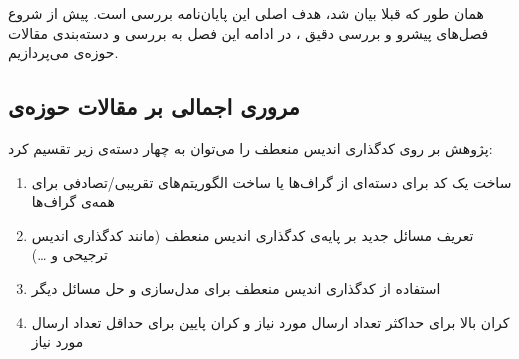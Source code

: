  همان طور که قبلا بیان شد، هدف اصلی این پایان‌نامه بررسی
 \picod
 است. پیش از شروع فصل‌های پیشرو و بررسی دقیق 
 \picods، در ادامه این فصل به بررسی و دسته‌بندی مقالات حوزه‌ی
  \picod
  می‌پردازیم.
 \subsection{مروری اجمالی بر مقالات حوزه‌ی
 	\picod}
  پژوهش بر روی کدگذاری اندیس منعطف را می‌توان به چهار دسته‌ی زیر تقسیم کرد:
 \begin{enumerate}
 	\item 
 	ساخت یک کد برای دسته‌ای از گراف‌ها یا ساخت الگوریتم‌های تقریبی/تصادفی برای همه‌ی گراف‌ها
 	\item 
 	تعریف مسائل جدید بر پایه‌ی کدگذاری اندیس منعطف (مانند کدگذاری اندیس ترجیحی و \ldots)
 	\item 
 	استفاده از کدگذاری اندیس منعطف برای مدل‌سازی و حل مسائل دیگر
 	\item 
 	کران بالا برای حداکثر تعداد ارسال مورد نیاز و کران پایین برای حداقل تعداد ارسال مورد نیاز
 \end{enumerate}
 
